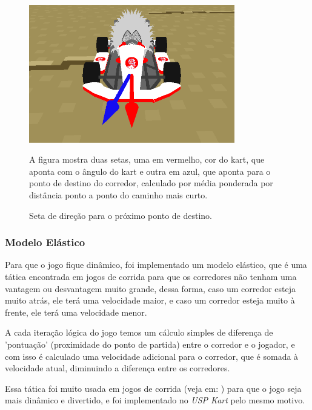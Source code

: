 \begin{figure}[H]
    \centering
    \includegraphics[width=0.8\textwidth]{figuras/direção.png}
    \caption{Seta de direção para o próximo ponto de destino.}
    \footnotesize{A figura mostra duas setas, uma em vermelho, cor do kart, que aponta com o ângulo do kart e outra em azul, que aponta para o ponto de destino do corredor, calculado por média ponderada por distância ponto a ponto do caminho mais curto.}
    \label{fig:arrow}
\end{figure}

\subsubsection{Modelo Elástico}

Para que o jogo fique dinâmico, foi implementado um modelo elástico, que é uma tática encontrada em jogos de corrida para que os corredores não tenham uma vantagem ou desvantagem muito grande, dessa forma, caso um corredor esteja muito atrás, ele terá uma velocidade maior, e caso um corredor esteja muito à frente, ele terá uma velocidade menor.

A cada iteração lógica do jogo temos um cálculo simples de diferença de 'pontuação' (proximidade do ponto de partida) entre o corredor e o jogador, e com isso é calculado uma velocidade adicional para o corredor, que é somada à velocidade atual, diminuindo a diferença entre os corredores.

Essa tática foi muito usada em jogos de corrida (veja em: \cite{rubberBandAi}) para que o jogo seja mais dinâmico e divertido, e foi implementado no \textit{USP Kart} pelo mesmo motivo.
